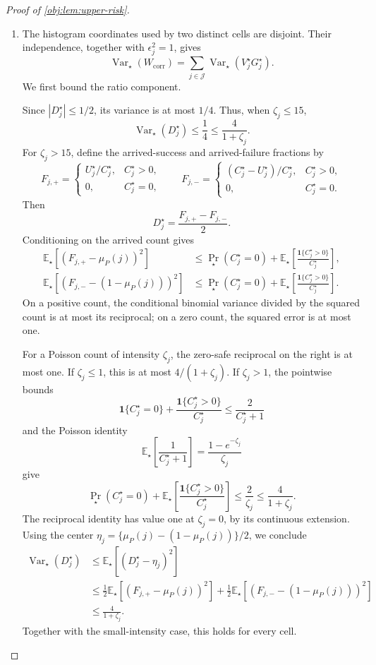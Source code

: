 \begin{proof}[Proof of \cref{obj:lem:upper-risk}]
\begin{enumerate}
\item The histogram coordinates used by two distinct cells are disjoint. Their independence, together with \(\epsilon_j^2=1\), gives
\[
\operatorname{Var}_\star(W_{\mathrm{corr}})
=\sum_{j\in\mathcal J}
\operatorname{Var}_\star(V_j^\star G_j^\star).
\]
We first bound the ratio component.

Since \(|D_j^\star|\le1/2\), its variance is at most \(1/4\). Thus, when \(\zeta_j\le15\),
\[
\operatorname{Var}_\star(D_j^\star)
\le\frac14\le\frac4{1+\zeta_j}.
\]
For \(\zeta_j>15\), define the arrived-success and arrived-failure fractions by
\[
F_{j,+}=
\begin{cases}
U_j^\star/C_j^\star,&C_j^\star>0,\\
0,&C_j^\star=0,
\end{cases}
\qquad
F_{j,-}=
\begin{cases}
(C_j^\star-U_j^\star)/C_j^\star,&C_j^\star>0,\\
0,&C_j^\star=0.
\end{cases}
\]
Then
\[
D_j^\star=\frac{F_{j,+}-F_{j,-}}2.
\]
Conditioning on the arrived count gives
\[
\begin{aligned}
\mathbb E_\star[(F_{j,+}-\mu_P(j))^2]
&\le
\Pr_\star(C_j^\star=0)
+\mathbb E_\star\!\left[
\frac{\mathbf1\{C_j^\star>0\}}{C_j^\star}\right],\\
\mathbb E_\star[(F_{j,-}-(1-\mu_P(j)))^2]
&\le
\Pr_\star(C_j^\star=0)
+\mathbb E_\star\!\left[
\frac{\mathbf1\{C_j^\star>0\}}{C_j^\star}\right].
\end{aligned}
\]
On a positive count, the conditional binomial variance divided by the squared count is at most its reciprocal; on a zero count, the squared error is at most one.

For a Poisson count of intensity \(\zeta_j\), the zero-safe reciprocal on the right is at most one. If \(\zeta_j\le1\), this is at most \(4/(1+\zeta_j)\). If \(\zeta_j>1\), the pointwise bounds
\[
\mathbf1\{C_j^\star=0\}
+\frac{\mathbf1\{C_j^\star>0\}}{C_j^\star}
\le\frac2{C_j^\star+1}
\]
and the Poisson identity
\[
\mathbb E_\star\!\left[\frac1{C_j^\star+1}\right]
=\frac{1-e^{-\zeta_j}}{\zeta_j}
\]
give
\[
\Pr_\star(C_j^\star=0)
+\mathbb E_\star\!\left[
\frac{\mathbf1\{C_j^\star>0\}}{C_j^\star}\right]
\le\frac2{\zeta_j}
\le\frac4{1+\zeta_j}.
\]
The reciprocal identity has value one at \(\zeta_j=0\), by its continuous extension. Using the center
\(\eta_j=\{\mu_P(j)-(1-\mu_P(j))\}/2\), we conclude
\[
\begin{aligned}
\operatorname{Var}_\star(D_j^\star)
&\le\mathbb E_\star[(D_j^\star-\eta_j)^2]\\
&\le\frac12\mathbb E_\star[(F_{j,+}-\mu_P(j))^2]
+\frac12\mathbb E_\star[(F_{j,-}-(1-\mu_P(j)))^2]\\
&\le\frac4{1+\zeta_j}.
\end{aligned}
\]
Together with the small-intensity case, this holds for every cell.


\end{enumerate}
\end{proof}

